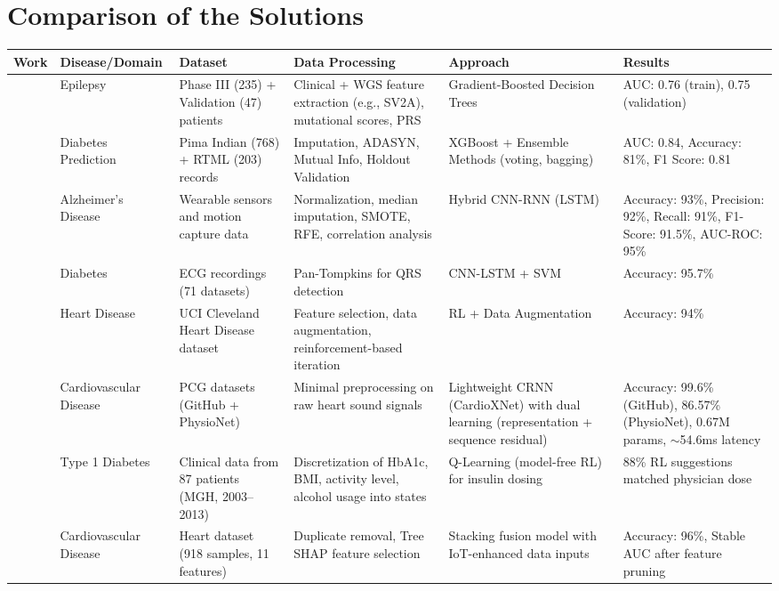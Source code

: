 \section{Comparison of the Solutions}
\begin{table}[htbp]
\begin{adjustwidth}{-2cm}{-2cm}
\centering
\scriptsize
\begin{tabular}{|p{1.5cm}|p{2.5cm}|p{3cm}|p{3.5cm}|p{2.5cm}|p{2.5cm}|}
\hline
\textbf{Work} & \textbf{Disease/Domain} & \textbf{Dataset} & \textbf{Data Processing} & \textbf{Approach} & \textbf{Results} \\
\hline
\cite{article_1} & Epilepsy & Phase III (235) + Validation (47) patients & Clinical + WGS feature extraction (e.g., SV2A), mutational scores, PRS & Gradient-Boosted Decision Trees & AUC: 0.76 (train), 0.75 (validation) \\
\hline
\cite{article_2} & Diabetes Prediction & Pima Indian (768) + RTML (203) records & Imputation, ADASYN, Mutual Info, Holdout Validation & XGBoost + Ensemble Methods (voting, bagging) & AUC: 0.84, Accuracy: 81\%, F1 Score: 0.81 \\
\hline
\cite{article_3} & Alzheimer’s Disease & Wearable sensors and motion capture data & Normalization, median imputation, SMOTE, RFE, correlation analysis & Hybrid CNN-RNN (LSTM) & Accuracy: 93\%, Precision: 92\%, Recall: 91\%, F1-Score: 91.5\%, AUC-ROC: 95\% \\
\hline
\cite{article_4} & Diabetes & ECG recordings (71 datasets) & Pan-Tompkins for QRS detection & CNN-LSTM + SVM & Accuracy: 95.7\% \\
\hline
\cite{article_5} & Heart Disease & UCI Cleveland Heart Disease dataset & Feature selection, data augmentation, reinforcement-based iteration & RL + Data Augmentation & Accuracy: 94\% \\
\hline
\cite{article_6} & Cardiovascular Disease & PCG datasets (GitHub + PhysioNet) & Minimal preprocessing on raw heart sound signals & Lightweight CRNN (CardioXNet) with dual learning (representation + sequence residual) & Accuracy: 99.6\% (GitHub), 86.57\% (PhysioNet), 0.67M params, $\sim$54.6ms latency \\
\hline
\cite{article_7} & Type 1 Diabetes & Clinical data from 87 patients (MGH, 2003–2013) & Discretization of HbA1c, BMI, activity level, alcohol usage into states & Q-Learning (model-free RL) for insulin dosing & 88\% RL suggestions matched physician dose \\
\hline
\cite{article_8} & Cardiovascular Disease & Heart dataset (918 samples, 11 features) & Duplicate removal, Tree SHAP feature selection & Stacking fusion model with IoT-enhanced data inputs & Accuracy: 96\%, Stable AUC after feature pruning \\

\end{tabular}
\end{adjustwidth}
\end{table}
